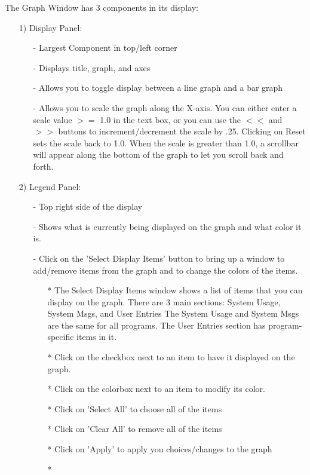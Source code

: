 \documentclass[10pt]{article}
\begin{document}
The Graph Window has 3 components in its display:
\begin{enumerate}
\item[1)]
Display Panel:
   \begin{itemize}
   \item[-]
   Largest Component in top/left corner
   \item[-]
   Displays title, graph, and axes
   \item[-]
   Allows you to toggle display between a line graph and a bar graph
   \item[-]
   Allows you to scale the graph along the X-axis.  You can either
   enter a scale value $>=$ 1.0 in the text box, or you can use the
   $<<$ and $>>$ buttons to increment/decrement the scale by .25.
   Clicking on Reset sets the scale back to 1.0.  When the scale is
   greater than 1.0, a scrollbar will appear along the bottom of the
   graph to let you scroll back and forth.
   \end{itemize}
\item[2)]
Legend Panel:
   \begin{itemize}
   \item[-]
   Top right side of the display
   \item[-]
   Shows what is currently being displayed on the graph and what color it
   is.
   \item[-]
   Click on the 'Select Display Items' button to bring up a window to
   add/remove items from the graph and to change the colors of the items.
      \begin{itemize}
      \item[*]
      The Select Display Items window shows a list of items that you
      can display on the graph.  There are 3 main sections: System
      Usage, System Msgs, and User Entries The System Usage and System
      Msgs are the same for all programs.  The User Entries section
      has program-specific items in it.
      \item[*]
      Click on the checkbox next to an item to have it displayed on the
      graph.
      \item[*]
      Click on the colorbox next to an item to modify its color.
      \item[*]
      Click on 'Select All' to choose all of the items
      \item[*]
      Click on 'Clear All' to remove all of the items
      \item[*]
      Click on 'Apply' to apply you choices/changes to the graph
      \item[*]

\end{itemize}
\end{itemize}
\end{enumerate}
\end{document}
